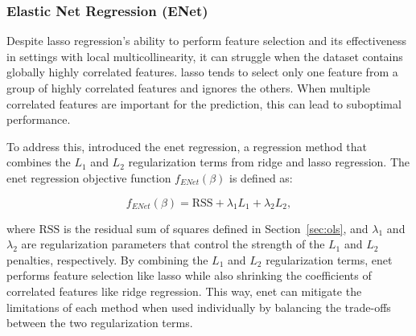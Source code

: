 \subsubsection{Elastic Net Regression (ENet)}
Despite \gls{lasso} regression's ability to perform feature selection and its effectiveness in settings with local multicollinearity, it can struggle when the dataset contains globally highly correlated features.
\gls{lasso} tends to select only one feature from a group of highly correlated features and ignores the others.
When multiple correlated features are important for the prediction, this can lead to suboptimal performance.

To address this, \citet{zou_regularization_2005} introduced the \gls{enet} regression, a regression method that combines the $L_1$ and $L_2$ regularization terms from ridge and \gls{lasso} regression.
The \gls{enet} regression objective function $f_{ENet}(\beta)$ is defined as:

$$
f_{ENet}(\beta) = \text{RSS} + \lambda_1 L_1 + \lambda_2 L_2,
$$

where $\text{RSS}$ is the residual sum of squares defined in Section~\ref{sec:ols}, and $\lambda_1$ and $\lambda_2$ are regularization parameters that control the strength of the $L_1$ and $L_2$ penalties, respectively.
By combining the $L_1$ and $L_2$ regularization terms, \gls{enet} performs feature selection like \gls{lasso} while also shrinking the coefficients of correlated features like ridge regression.
This way, \gls{enet} can mitigate the limitations of each method when used individually by balancing the trade-offs between the two regularization terms.